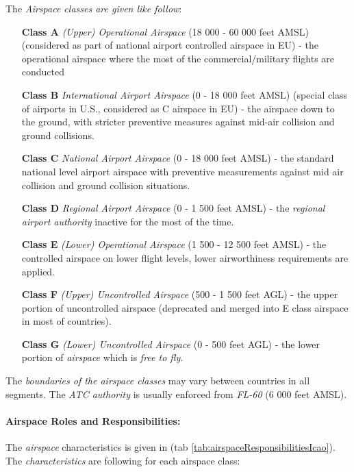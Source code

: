 \noindent The \emph{Airspace classes are given like follow}:
\begin{enumerate}
    \item[\textbf{Class A}] \emph{(Upper) Operational Airspace} (18 000 - 60 000 feet AMSL) (considered as part of national airport controlled airspace in EU) - the operational airspace where the most of the commercial/military flights are conducted
    
    \item[\textbf{Class B}] \emph{International Airport Airspace} (0 - 18 000 feet AMSL) (special class of airports in U.S., considered as C airspace in EU) - the airspace down to the ground, with stricter preventive measures against mid-air collision and ground collisions.
    
    \item[\textbf{Class C}] \emph{National Airport Airspace} (0 - 18 000 feet AMSL) - the standard  national level airport airspace with preventive measurements against mid air collision and ground collision situations.
    
    \item[\textbf{Class D}] \emph{Regional Airport Airspace} (0 - 1 500 feet AMSL) - the \emph{regional airport authority} inactive for the most of the time.
    
    \item[\textbf{Class E}] \emph{(Lower) Operational Airspace} (1 500 - 12 500 feet AMSL) - the controlled airspace on lower flight levels, lower airworthiness requirements are applied.
    
    \item[\textbf{Class F}] \emph{(Upper) Uncontrolled Airspace} (500 - 1 500 feet AGL) - the upper portion of uncontrolled airspace (deprecated and merged into E class airspace in most of countries).
    
    \item[\textbf{Class G}] \emph{(Lower) Uncontrolled Airspace} (0 - 500 feet AGL) - the lower portion of \emph{airspace} which is \emph{free to fly}.
\end{enumerate}

\begin{note}
    The \emph{boundaries of the airspace classes} may vary between countries in all segments. The \emph{ATC authority} is usually enforced from \emph{FL-60} (6 000 feet AMSL).
\end{note}


\paragraph{Airspace Roles and Responsibilities:} The \emph{airspace} characteristics is given in (tab \ref{tab:airspaceResponsibilitiesIcao}). The \emph{characteristics} are following for each airspace class:

